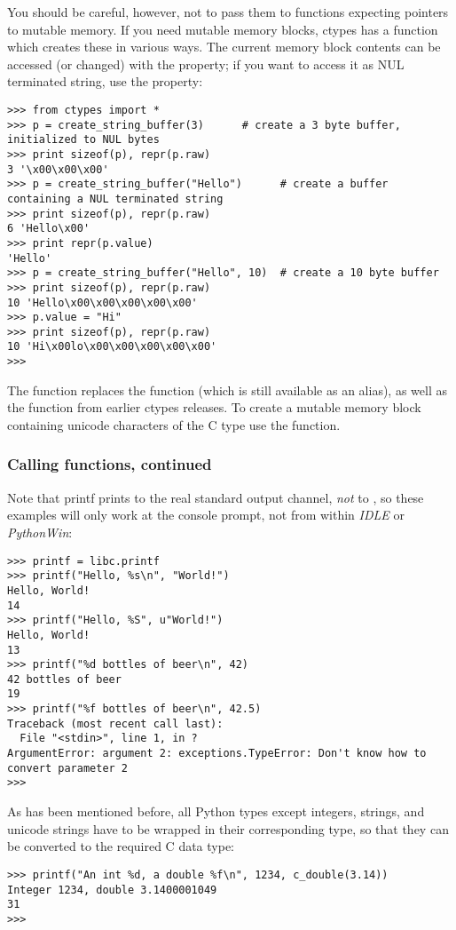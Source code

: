 You should be careful, however, not to pass them to functions
expecting pointers to mutable memory. If you need mutable memory
blocks, ctypes has a  function which creates
these in various ways.  The current memory block contents can be
accessed (or changed) with the  property; if you want to access
it as NUL terminated string, use the  property:
\begin{verbatim}
>>> from ctypes import *
>>> p = create_string_buffer(3)      # create a 3 byte buffer, initialized to NUL bytes
>>> print sizeof(p), repr(p.raw)
3 '\x00\x00\x00'
>>> p = create_string_buffer("Hello")      # create a buffer containing a NUL terminated string
>>> print sizeof(p), repr(p.raw)
6 'Hello\x00'
>>> print repr(p.value)
'Hello'
>>> p = create_string_buffer("Hello", 10)  # create a 10 byte buffer
>>> print sizeof(p), repr(p.raw)
10 'Hello\x00\x00\x00\x00\x00'
>>> p.value = "Hi"      
>>> print sizeof(p), repr(p.raw)
10 'Hi\x00lo\x00\x00\x00\x00\x00'
>>>
\end{verbatim}

The  function replaces the 
function (which is still available as an alias), as well as the
 function from earlier ctypes releases.  To create a
mutable memory block containing unicode characters of the C type
 use the  function.


\subsubsection{Calling functions, continued\label{ctypes-calling-functions-continued}}

Note that printf prints to the real standard output channel, \emph{not} to
, so these examples will only work at the console
prompt, not from within \emph{IDLE} or \emph{PythonWin}:
\begin{verbatim}
>>> printf = libc.printf
>>> printf("Hello, %s\n", "World!")
Hello, World!
14
>>> printf("Hello, %S", u"World!")
Hello, World!
13
>>> printf("%d bottles of beer\n", 42)
42 bottles of beer
19
>>> printf("%f bottles of beer\n", 42.5)
Traceback (most recent call last):
  File "<stdin>", line 1, in ?
ArgumentError: argument 2: exceptions.TypeError: Don't know how to convert parameter 2
>>>
\end{verbatim}

As has been mentioned before, all Python types except integers,
strings, and unicode strings have to be wrapped in their corresponding
 type, so that they can be converted to the required C data
type:
\begin{verbatim}
>>> printf("An int %d, a double %f\n", 1234, c_double(3.14))
Integer 1234, double 3.1400001049
31
>>>
\end{verbatim}


